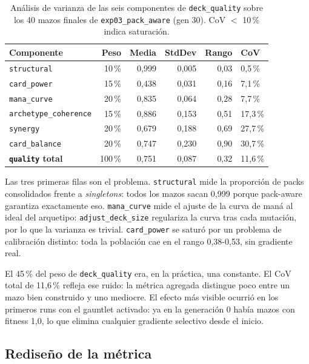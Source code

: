 \begin{table}[H]
\centering
\caption{Análisis de varianza de las seis componentes de \texttt{deck\_quality} sobre los 40 mazos finales de \texttt{exp03\_pack\_aware} (gen 30). CoV $<$ 10\,\% indica saturación.}
\label{tab:cov-quality}
\begin{tabular}{lrrrrl}
\toprule
\textbf{Componente} & \textbf{Peso} & \textbf{Media} & \textbf{StdDev} & \textbf{Rango} & \textbf{CoV} \\
\midrule
\texttt{structural}          & 10\,\% & 0,999 & 0,005 & 0,03 & 0,5\,\% \\
\texttt{card\_power}         & 15\,\% & 0,438 & 0,031 & 0,16 & 7,1\,\% \\
\texttt{mana\_curve}         & 20\,\% & 0,835 & 0,064 & 0,28 & 7,7\,\% \\
\midrule
\texttt{archetype\_coherence}& 15\,\% & 0,886 & 0,153 & 0,51 & 17,3\,\% \\
\texttt{synergy}             & 20\,\% & 0,679 & 0,188 & 0,69 & 27,7\,\% \\
\texttt{card\_balance}       & 20\,\% & 0,747 & 0,230 & 0,90 & 30,7\,\% \\
\midrule
\textbf{\texttt{quality} total} & 100\,\% & 0,751 & 0,087 & 0,32 & 11,6\,\% \\
\bottomrule
\end{tabular}
\end{table}

Las tres primeras filas son el problema. \texttt{structural} mide la proporción de packs consolidados frente a \emph{singletons}: todos los mazos sacan 0,999 porque pack-aware garantiza exactamente eso. \texttt{mana\_curve} mide el ajuste de la curva de maná al ideal del arquetipo: \texttt{adjust\_deck\_size} regulariza la curva tras cada mutación, por lo que la varianza es trivial. \texttt{card\_power} se saturó por un problema de calibración distinto: toda la población cae en el rango 0,38-0,53, sin gradiente real.

El 45\,\% del peso de \texttt{deck\_quality} era, en la práctica, una constante. El CoV total de 11,6\,\% refleja ese ruido: la métrica agregada distingue poco entre un mazo bien construido y uno mediocre. El efecto más visible ocurrió en los primeros runs con el gauntlet activado: ya en la generación 0 había mazos con fitness 1,0, lo que elimina cualquier gradiente selectivo desde el inicio.

\subsection{Rediseño de la métrica}

